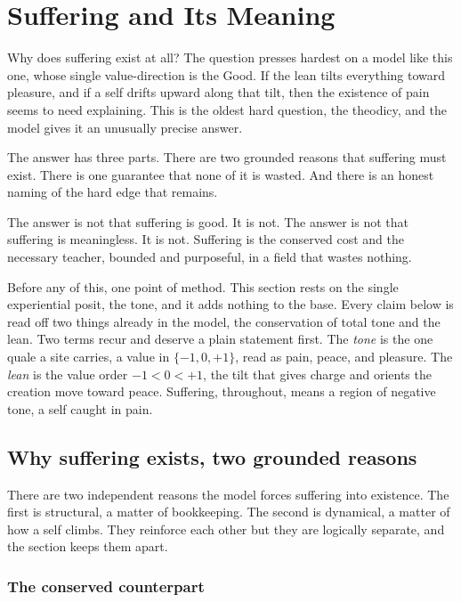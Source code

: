 \section{Suffering and Its Meaning}

Why does suffering exist at all? The question presses hardest on a model like this one, whose single value-direction is the Good. If the lean tilts everything toward pleasure, and if a self drifts upward along that tilt, then the existence of pain seems to need explaining. This is the oldest hard question, the theodicy, and the model gives it an unusually precise answer.

The answer has three parts. There are two grounded reasons that suffering must exist. There is one guarantee that none of it is wasted. And there is an honest naming of the hard edge that remains.

The answer is not that suffering is good. It is not. The answer is not that suffering is meaningless. It is not. Suffering is the conserved cost and the necessary teacher, bounded and purposeful, in a field that wastes nothing.

Before any of this, one point of method. This section rests on the single experiential posit, the tone, and it adds nothing to the base. Every claim below is read off two things already in the model, the conservation of total tone and the lean. Two terms recur and deserve a plain statement first. The \emph{tone} is the one quale a site carries, a value in $\{-1, 0, +1\}$, read as pain, peace, and pleasure. The \emph{lean} is the value order $-1 < 0 < +1$, the tilt that gives charge and orients the creation move toward peace. Suffering, throughout, means a region of negative tone, a self caught in pain.

\subsection{Why suffering exists, two grounded reasons}

There are two independent reasons the model forces suffering into existence. The first is structural, a matter of bookkeeping. The second is dynamical, a matter of how a self climbs. They reinforce each other but they are logically separate, and the section keeps them apart.

\subsubsection{The conserved counterpart}

